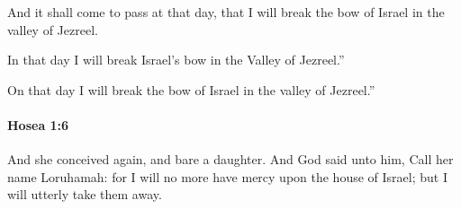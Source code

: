 			\begin{versebox}
					\item[BHS] 
					\item[LXX] 
					\item[ASV] And it shall come to pass at that day, that I will break the bow of Israel in the valley of Jezreel.
					\item[NIV] In that day I will break Israel’s bow in the Valley of Jezreel.”
					\item[NRSV] On that day I will break the bow of Israel in the valley of Jezreel.”
			\end{versebox}

		\paragraph{Hosea 1:6} %
			\label{HOSEA-1-6}

			And she conceived again, and bare a daughter. And God said unto him, Call her name Loruhamah: for I will no more have mercy upon the house of Israel; but I will utterly take them away.

